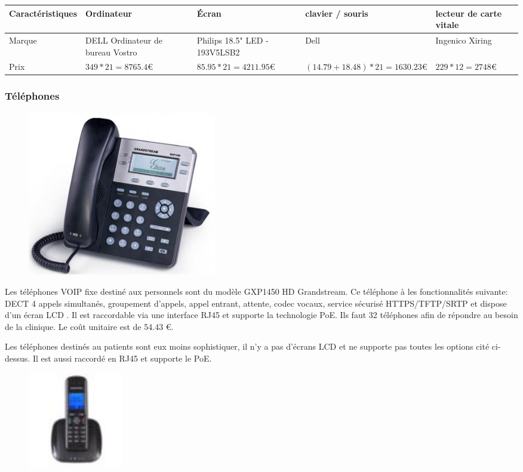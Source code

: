    \begin{center}
        \begin{tabular}{|l|p{2cm}|p{2cm}|p{2cm}|p{2cm}|}
          \hline
            Caractéristiques  & Ordinateur & Écran & clavier / souris & lecteur de carte vitale \\
          \hline
            Marque  & DELL Ordinateur de bureau Vostro & Philips 18.5" LED - 193V5LSB2 & Dell & Ingenico Xiring \\
        \hline
            Prix &
$ 349 * 21 = 8765.4 \euro   $
    &
$ 85.95 * 21 = 4211.95 \euro   $
    &
$ (14.79 + 18.48) * 21 = 1630.23 \euro   $
    &
$ 229 * 12 = 2748 \euro   $
 \\
          \hline
        \end{tabular}
    \end{center}



\subsubsection{Téléphones}

\begin{figure}[!ht]
    \center
    \includegraphics[width=0.4\textwidth]{./images/29.png}
\end{figure}

Les téléphones VOIP fixe destiné aux personnels sont du modèle GXP1450 HD Grandstream.
Ce téléphone à les fonctionnalités suivante: DECT 4 appels simultanés, groupement d'appels, appel entrant, attente, codec vocaux, service sécurisé HTTPS/TFTP/SRTP et dispose d'un écran LCD . Il est raccordable via une interface RJ45 et supporte la technologie PoE. Ils faut 32 téléphones afin de répondre au besoin de la clinique. Le coût unitaire est de 54.43 \euro.

Les téléphones destinés au patients sont eux moins sophistiquer, il n'y a pas d'écrans LCD et ne supporte pas toutes les options cité ci-dessus. Il est aussi raccordé en RJ45 et supporte le PoE.

\begin{figure}[!ht]
    \center
    \includegraphics[width=0.2\textwidth]{./images/31.png}
\end{figure}


